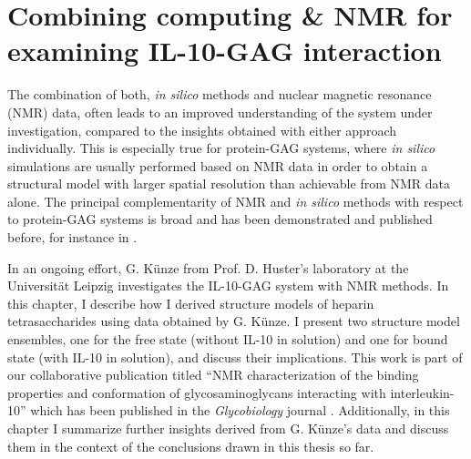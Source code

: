 \chapter{Combining computing \& NMR for examining IL-10-GAG interaction}
\label{chapter:nmr}

The combination of both, \textit{in silico} methods and nuclear magnetic
resonance (NMR) data, often leads to an improved understanding of the system
under investigation, compared to the insights obtained with either approach
individually. This is especially true for protein-GAG systems, where \textit{in
silico} simulations are usually performed based on NMR data in order to obtain a
structural model with larger spatial resolution than achievable from NMR data
alone. The principal complementarity of NMR and \textit{in silico} methods with
respect to protein-GAG systems is broad and has been demonstrated and published
before, for instance in \cite{pichert_characterization_2012, sost_heparin_2009,
nieto_conf_selection_heparin_2011}.

In an ongoing effort, G. Künze from Prof. D. Huster's laboratory at the
Universität Leipzig investigates the IL-10-GAG system with NMR methods. In this
chapter, I describe how I derived structure models of heparin tetrasaccharides
using data obtained by G. Künze. I present two structure model ensembles, one
for the free state (without IL-10 in solution) and one for bound state (with
IL-10 in solution), and discuss their implications. This work is part of our
collaborative publication titled \enquote{NMR characterization of the binding
properties and conformation of glycosaminoglycans interacting with
interleukin-10} which has been published in the \textit{Glycobiology} journal
\cite{kuenze_gehrcke_2014}. Additionally, in this chapter I summarize further
insights derived from G. Künze's data and discuss them in the context of the
conclusions drawn in this thesis so far.


